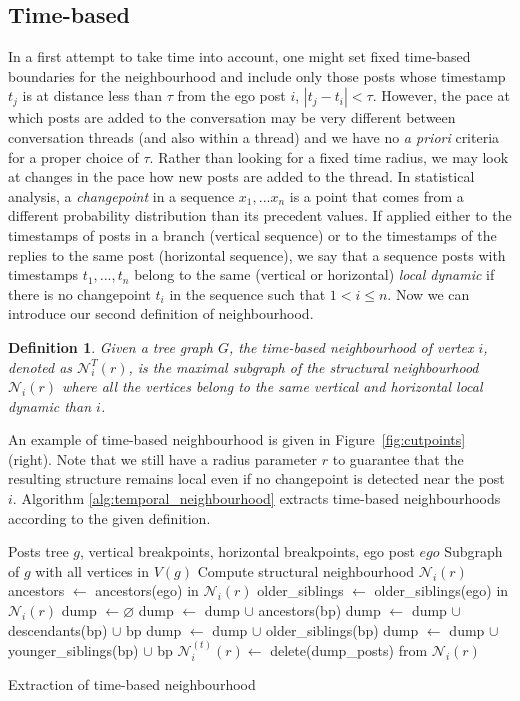\documentclass[conference]{IEEEtran}
\newtheorem{definition}{Definition}
\begin{document}
\subsection{Time-based}
In a first attempt to take time into account, one might set fixed time-based boundaries for the neighbourhood and include only those posts whose timestamp $t_j$ is at distance less than $\tau$ from the ego post $i$, $|t_j-t_i|<\tau$. However, the pace at which posts are added to the conversation may be very different between conversation threads (and also within a thread) and we have no \textit{a priori} criteria for a proper choice of $\tau$. 
Rather than looking for a fixed time radius, we may look at changes in the pace how new posts are added to the thread. In statistical analysis, a \textit{changepoint} in a sequence $x_1,...x_n$ is a point that comes from a different probability distribution than its precedent values. If applied either to the timestamps of posts in a branch (vertical sequence) or to the timestamps of the replies to the same post (horizontal sequence), we say that a sequence posts with timestamps $t_1,...,t_n$ belong to the same (vertical or horizontal) \textit{local dynamic} if there is no changepoint $t_i$ in the sequence such that $1 < i \leq n$. Now we can introduce our second definition of neighbourhood.
\begin{definition}
Given a tree graph $G$, the \textit{time-based neighbourhood} of vertex $i$, denoted as $\mathcal{N}_{i}^T(r)$, is the maximal subgraph of the structural neighbourhood $\mathcal{N}_i(r)$ where all the vertices  belong to the same vertical and horizontal local dynamic than $i$.
\end{definition}
An example of time-based neighbourhood is given in Figure~\ref{fig:cutpoints} (right).
Note that we still have a radius parameter $r$ to guarantee that the resulting structure remains local even if no changepoint is detected near the post $i$. Algorithm \ref{alg:temporal_neighbourhood} extracts time-based neighbourhoods according to the given definition. 
\begin{algorithm}[H]
\begin{algorithmic}
\REQUIRE Posts tree $g$, vertical breakpoints, horizontal breakpoints, ego post $ego$
\ENSURE Subgraph of $g$ with all vertices in $V(g)$
\STATE Compute structural neighbourhood $\mathcal{N}_i(r)$
\STATE ancestors $\leftarrow$  ancestors(ego) in $\mathcal{N}_i(r)$
\STATE older\_siblings $\leftarrow$ older\_siblings(ego) in $\mathcal{N}_i(r)$
\STATE dump $\leftarrow \varnothing$
   \STATE dump $\leftarrow$ dump $\cup$ ancestors(bp)
 \ELSE
   \STATE dump $\leftarrow$ dump $\cup$ descendants(bp) $\cup$ bp
  \ENDIF
\ENDFOR
{}
     \STATE dump $\leftarrow$ dump $\cup$ older\_siblings(bp)
   \ELSE
     \STATE dump $\leftarrow$ dump $\cup$ younger\_siblings(bp) $\cup$ bp
  \ENDIF
\ENDFOR
\STATE $\mathcal{N}_i^{(t)}(r) \leftarrow$ delete(dump\_posts) from $\mathcal{N}_i(r)$
\end{algorithmic}
\caption{Extraction of time-based neighbourhood}
\label{alg:temporal_neighbourhood}
\end{algorithm}
\end{document}

